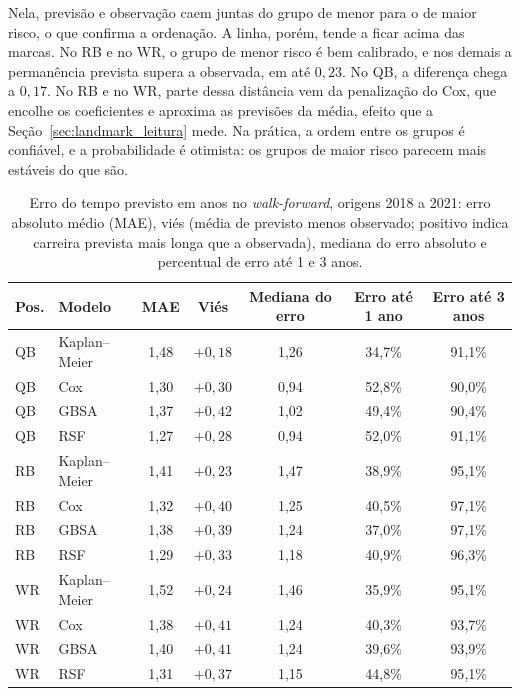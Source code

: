 Nela, previsão e observação caem juntas do grupo de menor para o de maior risco, o que confirma a ordenação. A linha, porém, tende a ficar acima das marcas. No RB e no WR, o grupo de menor risco é bem calibrado, e nos demais a permanência prevista supera a observada, em até $0{,}23$. No QB, a diferença chega a $0{,}17$. No RB e no WR, parte dessa distância vem da penalização do Cox, que encolhe os coeficientes e aproxima as previsões da média, efeito que a Seção~\ref{sec:landmark_leitura} mede. Na prática, a ordem entre os grupos é confiável, e a probabilidade é otimista: os grupos de maior risco parecem mais estáveis do que são.

\begin{table}[H]
\centering
\caption{Erro do tempo previsto em anos no \textit{walk-forward}, origens 2018 a 2021: erro absoluto médio (MAE), viés (média de previsto menos observado; positivo indica carreira prevista mais longa que a observada), mediana do erro absoluto e percentual de erro até 1 e 3 anos.}
\label{tab:tgb_hit}
\thesistablesetup\footnotesize
\begin{tabular*}{\textwidth}{@{\extracolsep{\fill}}llccccc@{}}
\toprule
\textbf{Pos.} & \textbf{Modelo} & \textbf{MAE} & \textbf{Viés} & \textbf{Mediana do erro} & \textbf{Erro até 1 ano} & \textbf{Erro até 3 anos} \\
\midrule
QB & Kaplan--Meier & 1{,}48 & $+0{,}18$ & 1{,}26 & 34{,}7\% & 91{,}1\% \\
QB & Cox           & 1{,}30 & $+0{,}30$ & 0{,}94 & 52{,}8\% & 90{,}0\% \\
QB & GBSA          & 1{,}37 & $+0{,}42$ & 1{,}02 & 49{,}4\% & 90{,}4\% \\
QB & RSF           & 1{,}27 & $+0{,}28$ & 0{,}94 & 52{,}0\% & 91{,}1\% \\
\midrule
RB & Kaplan--Meier & 1{,}41 & $+0{,}23$ & 1{,}47 & 38{,}9\% & 95{,}1\% \\
RB & Cox           & 1{,}32 & $+0{,}40$ & 1{,}25 & 40{,}5\% & 97{,}1\% \\
RB & GBSA          & 1{,}38 & $+0{,}39$ & 1{,}24 & 37{,}0\% & 97{,}1\% \\
RB & RSF           & 1{,}29 & $+0{,}33$ & 1{,}18 & 40{,}9\% & 96{,}3\% \\
\midrule
WR & Kaplan--Meier & 1{,}52 & $+0{,}24$ & 1{,}46 & 35{,}9\% & 95{,}1\% \\
WR & Cox           & 1{,}38 & $+0{,}41$ & 1{,}24 & 40{,}3\% & 93{,}7\% \\
WR & GBSA          & 1{,}40 & $+0{,}41$ & 1{,}24 & 39{,}6\% & 93{,}9\% \\
WR & RSF           & 1{,}31 & $+0{,}37$ & 1{,}15 & 44{,}8\% & 95{,}1\% \\
\bottomrule
\end{tabular*}
\end{table}


